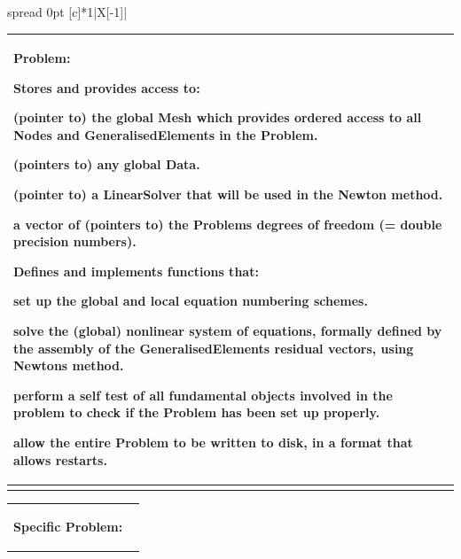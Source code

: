 \begin{center} \tabulinesep=1mm
\begin{longtabu} spread 0pt [c]{*{1}{|X[-1]}|}
\hline
\begin{center} \begin{tabularx}{\linewidth}{|*{1}{>{\raggedright\arraybackslash}X|}}\hline
\begin{center} {\bfseries Problem\+:} \end{center} 
\begin{DoxyItemize}
\item Stores and provides access to\+:
\begin{DoxyItemize}
\item (pointer to) the global {\ttfamily Mesh} which provides ordered access to all {\ttfamily Nodes} and {\ttfamily Generalised\+Elements} in the {\ttfamily Problem}.
\item (pointers to) any global {\ttfamily Data}.
\item (pointer to) a {\ttfamily Linear\+Solver} that will be used in the Newton method.
\item a vector of (pointers to) the {\ttfamily Problem\textquotesingle{}s} degrees of freedom (= double precision numbers).
\end{DoxyItemize}
\item Defines and implements functions that\+:
\begin{DoxyItemize}
\item set up the global and local equation numbering schemes.
\item solve the (global) nonlinear system of equations, formally defined by the assembly of the {\ttfamily Generalised\+Element\textquotesingle{}s} residual vectors, using Newton\textquotesingle{}s method.
\item perform a self test of all fundamental objects involved in the problem to check if the {\ttfamily Problem} has been set up properly.
\item allow the entire Problem to be written to disk, in a format that allows restarts.   
\end{DoxyItemize}
\end{DoxyItemize}\\\cline{1-1}
\end{tabularx}
\end{center}  \begin{center} \begin{tabularx}{\linewidth}{|*{1}{>{\raggedright\arraybackslash}X|}}\hline
\begin{center} {\bfseries Specific Problem\+:} ~\newline

\end{center}
\end{tabularx}
\end{center}
\end{longtabu}
\end{center}
